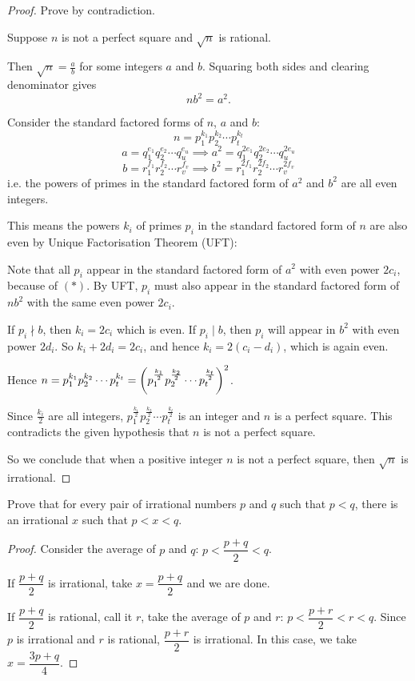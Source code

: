 \begin{proof}
Prove by contradiction.

Suppose $n$ is not a perfect square and $\sqrt{n}$ is rational.

Then $\sqrt{n}=\frac{a}{b}$ for some integers $a$ and $b$. Squaring both sides and clearing denominator gives 
\begin{equation*}\tag{$\ast$}
nb^2=a^2.
\end{equation*}

Consider the standard factored forms of $n$, $a$ and $b$:
\[ n=p_1^{k_1}p_2^{k_2}\cdots p_t^{k_t} \]
\[ a=q_1^{e_1}q_2^{e_2}\cdots q_u^{e_u} \implies a^2=q_1^{2e_1}q_2^{2e_2}\cdots q_u^{2e_u} \]
\[ b=r_1^{f_1}r_2^{f_2}\cdots r_v^{f_v} \implies b^2=r_1^{2f_1}r_2^{2f_2}\cdots r_v^{2f_v} \]
i.e. the powers of primes in the standard factored form of $a^2$ and $b^2$ are all even integers. 

This means the powers $k_i$ of primes $p_i$ in the standard factored form of $n$ are also even by Unique Factorisation Theorem (UFT):

Note that all $p_i$ appear in the standard factored form of $a^2$ with even power $2c_i$, because of $(\ast)$. By UFT, $p_i$ must also appear in the standard factored form of $nb^2$ with the same even power $2c_i$.

If $p_i\nmid b$, then $k_i=2c_i$ which is even. If $p_i\mid b$, then $p_i$ will appear in $b^2$ with even power $2d_i$. So $k_i+2d_i=2c_i$, and hence $k_i=2(c_i-d_i)$, which is again even.

Hence $n=p_1^{k_1}p_2^{k_2}\cdots p_t^{k_t}=\left(p_1^{\frac{k_1}{2}}p_2^{\frac{k_2}{2}}\cdots p_t^{\frac{k_t}{2}}\right)^2$.

Since $\frac{k_i}{2}$ are all integers, $p_1^{\frac{k_1}{2}}p_2^{\frac{k_2}{2}}\cdots p_t^{\frac{k_t}{2}}$ is an integer and $n$ is a perfect square. This contradicts the given hypothesis that $n$ is not a perfect square.

So we conclude that when a positive integer $n$ is not a perfect square, then $\sqrt{n}$ is irrational.
\end{proof}

\begin{prbm}
Prove that for every pair of irrational numbers $p$ and $q$ such that $p<q$, there is an irrational $x$ such that $p<x<q$.
\end{prbm}

\begin{proof}
Consider the average of $p$ and $q$: $p<\dfrac{p+q}{2}<q$.

If $\dfrac{p+q}{2}$ is irrational, take $x=\dfrac{p+q}{2}$ and we are done.

If $\dfrac{p+q}{2}$ is rational, call it $r$, take the average of $p$ and $r$: $p<\dfrac{p+r}{2}<r<q$. Since $p$ is irrational and $r$ is rational, $\dfrac{p+r}{2}$ is irrational. In this case, we take $x=\dfrac{3p+q}{4}$.
\end{proof}


